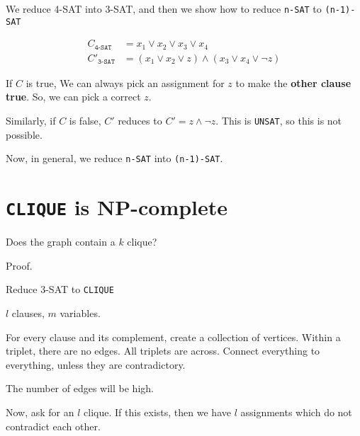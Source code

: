 We reduce 4-SAT into 3-SAT, and then we show how to reduce \texttt{n-SAT} to \texttt{(n-1)-SAT}

\begin{align*}
    C_{\texttt{4-SAT}} &= x_1 \lor x_2 \lor x_3 \lor x_4 \\
    C'_{\texttt{3-SAT}} &= (x_1 \lor x_2 \lor z) \land (x_3 \lor x_4 \lor \lnot{z})
\end{align*}

If $C$ is true, We can always pick an assignment for $z$ to make the \textbf{other clause true}.
So, we can pick a correct $z$.

Similarly, if $C$ is false, $C'$ reduces to $C' = z \land \lnot{z}$. This 
is \texttt{UNSAT}, so this is not possible.

Now, in general, we reduce \texttt{n-SAT} into \texttt{(n-1)-SAT}.

\section{\texttt{CLIQUE} is NP-complete}
Does the graph contain a $k$ clique?

Proof.

Reduce 3-SAT to \texttt{CLIQUE}

$l$ clauses, $m$ variables.

For every clause and its complement, create a collection of vertices. Within
a triplet, there are no edges. All triplets are across. Connect everything
to everything, unless they are contradictory. 

The number of edges will be high.

Now, ask for an $l$ clique. If this exists, then we have $l$ assignments
which do not contradict each other.
